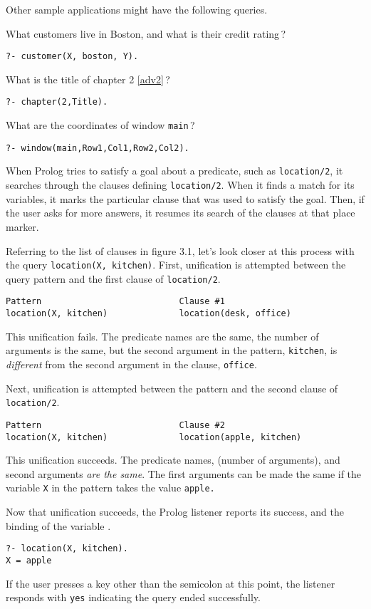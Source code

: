 Other sample applications might have the following queries.

What customers live in Boston, and what is their credit rating\,?
\begin{verbatim}
?- customer(X, boston, Y).
\end{verbatim}

What is the title of chapter 2 \ref{adv2}\,?
\begin{verbatim}
?- chapter(2,Title).
\end{verbatim}

What are the coordinates of window \verb'main'\,?
\begin{verbatim}
?- window(main,Row1,Col1,Row2,Col2).
\end{verbatim}


When Prolog tries to satisfy a goal about a predicate, such as
\verb'location/2', it searches through the clauses defining \verb'location/2'.
When it finds a match for its variables, it marks the particular clause that was
used to satisfy the goal. Then, if the user asks for more answers, it resumes
its search of the clauses at that place marker.

Referring to the list of clauses in figure 3.1, let's look closer at this
process with the query \verb'location(X, kitchen)'. First, unification is
attempted between the query pattern and the first clause of \verb'location/2'.
\begin{verbatim}
Pattern                           Clause #1 
location(X, kitchen)              location(desk, office) 
\end{verbatim}
This unification fails. The predicate names are the same, the number of
arguments is the same, but the second argument in the pattern, \verb'kitchen',
is \emph{different} from the second argument in the clause, \verb'office'.

Next, unification is attempted between the pattern and the second clause of
\verb'location/2'.
\begin{verbatim}
Pattern                           Clause #2 
location(X, kitchen)              location(apple, kitchen) 
\end{verbatim}
This unification succeeds. The predicate names,  (number of
arguments), and second arguments \emph{are the same}. The first arguments can be
made the same if the variable \verb'X' in the pattern takes the value
\verb'apple.'

Now that unification succeeds, the Prolog listener reports its success, and the
binding of the variable .
\begin{verbatim}
?- location(X, kitchen).
X = apple
\end{verbatim}
If the user presses a key other than the semicolon \keys{;} at this point, the
listener responds with \verb'yes' indicating the query ended successfully.


